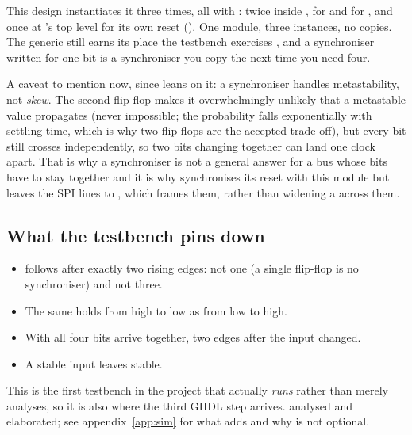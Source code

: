 This design instantiates it three times, all with : twice inside
, for  and for , and once at 's
top level for its own reset (). One module, three instances, no copies. The generic
still earns its place \textemdash{} the testbench exercises , and a synchroniser
written for one bit is a synchroniser you copy the next time you need four.

\begin{warning}
A caveat to mention now, since  leans on it: a synchroniser handles metastability,
not \emph{skew}. The second flip-flop makes it overwhelmingly unlikely that a metastable value
propagates (never impossible; the probability falls exponentially with settling time, which is why
two flip-flops are the accepted trade-off), but every bit still crosses independently, so two bits
changing together can land one clock apart. That is why a synchroniser is not a general answer for a
bus whose bits have to stay together \textemdash{} and it is why  synchronises its
reset with this module but leaves the SPI lines to , which frames them, rather than
widening a  across them.
\end{warning}

\subsection{What the testbench pins down}
\label{c12:sub:mptb}

\begin{itemize}
  \item {} follows  after exactly two rising edges: not one (a single
    flip-flop is no synchroniser) and not three.
  \item The same holds from high to low as from low to high.
  \item With  all four bits arrive together, two edges after the input changed.
  \item A stable input leaves  stable.
\end{itemize}

This is the first testbench in the project that actually \emph{runs} rather than merely analyses, so
it is also where the third GHDL step arrives.  analysed and elaborated; see
appendix~\ref{app:sim} for what  adds and why  is not
optional.

